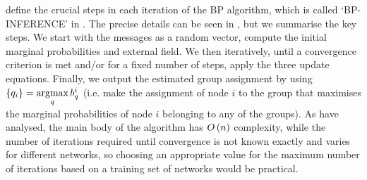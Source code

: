  define the crucial steps in each iteration of the BP algorithm, which is called `\textsc{BP-INFERENCE}' in \cite{DKM+13}.
The precise details can be seen in \cite{DKM+13}, but we summarise the key steps.
We start with the messages as a random vector, compute the initial marginal probabilities and external field.
We then iteratively, until a convergence criterion is met and/or for a fixed number of steps, apply the three update equations.
Finally, we output the estimated group assignment by using $\{ q_{i} \} = \argmax_{q} b_{q}^{i}$ (i.e. make the assignment of node $i$ to the group that maximises the marginal probabilities of node $i$ belonging to any of the groups).
As \cite{DKM+13} have analysed, the main body of the algorithm has $O\left(n\right)$ complexity, while the number of iterations required until convergence is not known exactly and varies for different networks, so choosing an appropriate value for the maximum number of iterations based on a training set of networks would be practical.


